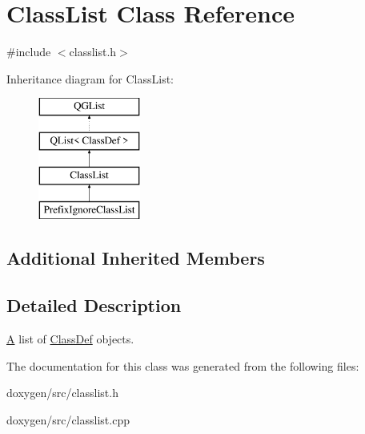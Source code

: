 \hypertarget{class_class_list}{}\section{Class\+List Class Reference}
\label{class_class_list}


{\ttfamily \#include $<$classlist.\+h$>$}

Inheritance diagram for Class\+List\+:\begin{figure}[H]
\begin{center}
\leavevmode
\includegraphics[height=4.000000cm]{class_class_list}
\end{center}
\end{figure}
\subsection*{Additional Inherited Members}


\subsection{Detailed Description}
\mbox{\hyperlink{class_a}{A}} list of \mbox{\hyperlink{class_class_def}{Class\+Def}} objects. 

The documentation for this class was generated from the following files\+:\begin{DoxyCompactItemize}
\item 
doxygen/src/classlist.\+h\item 
doxygen/src/classlist.\+cpp\end{DoxyCompactItemize}
